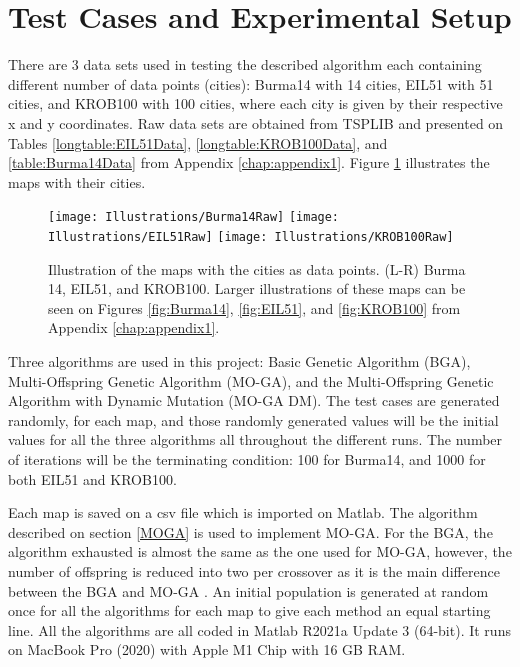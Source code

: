 \hfill

\section{Test Cases and Experimental Setup}
\indent \indent There are 3 data sets used in testing the described algorithm each containing different number of data points (cities): Burma14 with 14 cities, EIL51 with 51 cities, and KROB100 with 100 cities, where each city is given by their respective x and y coordinates. Raw data sets are obtained from TSPLIB and presented on Tables \ref{longtable:EIL51Data}, \ref{longtable:KROB100Data}, and \ref{table:Burma14Data} from Appendix \ref{chap:appendix1}. Figure \ref{fig:Maps} illustrates the maps with their cities.
\begin{figure}[htp]
	
	\centering
	\texttt{[image: Illustrations/Burma14Raw]}\hfill
	\texttt{[image: Illustrations/EIL51Raw]}\hfill
	\texttt{[image: Illustrations/KROB100Raw]}
	
	\caption{Illustration of the maps with the cities as data points. (L-R) Burma 14, EIL51, and KROB100. Larger illustrations of these maps can be seen on Figures \ref{fig:Burma14}, \ref{fig:EIL51}, and \ref{fig:KROB100} from Appendix \ref{chap:appendix1}.} 
	\label{fig:Maps}
\end{figure}

 Three algorithms are used in this project: Basic Genetic Algorithm (BGA), Multi-Offspring Genetic Algorithm (MO-GA), and the Multi-Offspring Genetic Algorithm with Dynamic Mutation (MO-GA DM). The test cases are generated randomly, for each map, and those randomly generated values will be the initial values for all the three algorithms all throughout the different runs. The number of iterations will be the terminating condition: 100 for Burma14, and 1000 for both EIL51 and KROB100. \par

Each map is saved on a csv file which is imported on Matlab. The algorithm described on section \ref{MOGA} is used to implement MO-GA. For the BGA, the algorithm exhausted is almost the same as the one used for MO-GA, however, the number of offspring is reduced into two per crossover as it is the main difference between the BGA and MO-GA \cite{wang2016multi}. An initial population is generated at random once for all the algorithms for each map to give each method an equal starting line. All the algorithms are all coded in Matlab R2021a Update 3 (64-bit). It runs on MacBook Pro (2020) with Apple M1 Chip with 16 GB RAM.